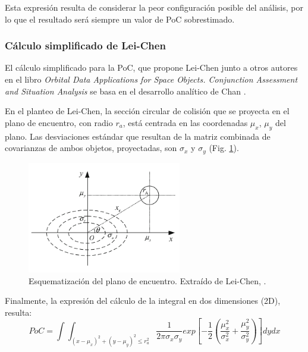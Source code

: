 Esta expresi\'on resulta de considerar la peor configuraci\'on  posible del an\'alisis, por lo que el resultado ser\'a siempre un valor de PoC sobrestimado. 



\subsubsection{C\'alculo simplificado de Lei-Chen}\label{subsec:pocsimp}

El c\'alculo simplificado para la PoC, que propone Lei-Chen junto a otros autores en el libro 
{\it{Orbital Data Applications for Space Objects. Conjunction Assessment and Situation Analysis}} \citep{leichen} se basa en el desarrollo anal\'itico de Chan \citep{chan2003improved}.

En el planteo de Lei-Chen, la secci\'on circular de colisi\'on que se proyecta en el plano de encuentro, con radio $r_{a}$, est\'a centrada en las coordenadas $\mu_{x}$, $\mu_{y}$ del plano. Las desviaciones est\'andar que resultan de la matriz combinada de covarianzas de ambos objetos, proyectadas, son $\sigma_{x}$ y $\sigma_{y}$  (Fig. \ref{fig:planoenc}).\\

\begin{figure}[!h]
\centering
\includegraphics[width=0.6\textwidth]{imagenes/planodeencuentro}
\caption[Plano de Encuentro]{Esquematizaci\'on del plano de encuentro. Extra\'ido de Lei-Chen, \citep{leichen}.}
\label{fig:planoenc}
\end{figure}

Finalmente, la expresi\'on del c\'alculo de la integral en dos dimensiones (2D), resulta:\\

\begin{equation}
 PoC=\int \int_{(x-\mu_{x})^{2}+(y-\mu_{y})^{2}\leq r_{a}^{2}} \frac{1}{2\pi\sigma_{x}\sigma_{y}} exp [-\frac{1}{2}(\frac{\mu_{x}^{2}}{\sigma_{x}^{2}}+\frac{\mu_{y}^{2}}{\sigma_{y}^{2}}) ] dy dx
 \label{eq:pocintegral}
\end{equation}


